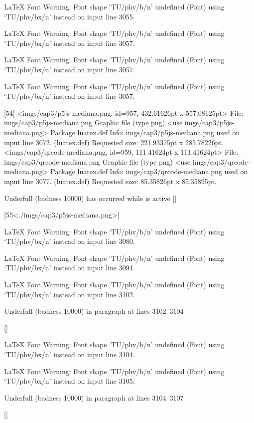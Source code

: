 LaTeX Font Warning: Font shape `TU/phv/b/n' undefined
(Font)              using `TU/phv/bx/n' instead on input line 3055.


LaTeX Font Warning: Font shape `TU/phv/b/n' undefined
(Font)              using `TU/phv/bx/n' instead on input line 3057.


LaTeX Font Warning: Font shape `TU/phv/b/n' undefined
(Font)              using `TU/phv/bx/n' instead on input line 3057.


LaTeX Font Warning: Font shape `TU/phv/b/n' undefined
(Font)              using `TU/phv/bx/n' instead on input line 3057.

[54]
<imgs/cap3/p5js-mediana.png, id=957, 432.61626pt x 557.08125pt>
File: imgs/cap3/p5js-mediana.png Graphic file (type png)
<use imgs/cap3/p5js-mediana.png>
Package luatex.def Info: imgs/cap3/p5js-mediana.png  used on input line 3072.
(luatex.def)             Requested size: 221.93375pt x 285.78226pt.
<imgs/cap3/qrcode-mediana.png, id=959, 111.41624pt x 111.41624pt>
File: imgs/cap3/qrcode-mediana.png Graphic file (type png)
<use imgs/cap3/qrcode-mediana.png>
Package luatex.def Info: imgs/cap3/qrcode-mediana.png  used on input line 3077.
(luatex.def)             Requested size: 85.35826pt x 85.35895pt.

Underfull \vbox (badness 10000) has occurred while \output is active []

[55<./imgs/cap3/p5js-mediana.png>]

LaTeX Font Warning: Font shape `TU/phv/b/n' undefined
(Font)              using `TU/phv/bx/n' instead on input line 3080.


LaTeX Font Warning: Font shape `TU/phv/b/n' undefined
(Font)              using `TU/phv/bx/n' instead on input line 3094.


LaTeX Font Warning: Font shape `TU/phv/b/n' undefined
(Font)              using `TU/phv/bx/n' instead on input line 3102.


Underfull \hbox (badness 10000) in paragraph at lines 3102--3104

 []


LaTeX Font Warning: Font shape `TU/phv/b/n' undefined
(Font)              using `TU/phv/bx/n' instead on input line 3104.


LaTeX Font Warning: Font shape `TU/phv/b/n' undefined
(Font)              using `TU/phv/bx/n' instead on input line 3105.


Underfull \hbox (badness 10000) in paragraph at lines 3104--3107

 []



